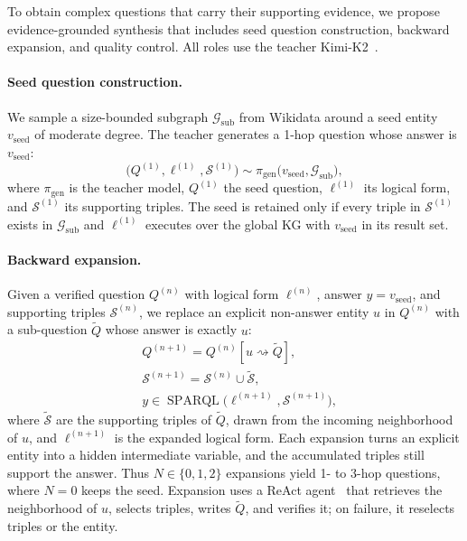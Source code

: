 To obtain complex questions that carry their supporting evidence, we propose evidence-grounded synthesis that includes seed question construction, backward expansion, and quality control. All roles use the teacher Kimi-K2~\citep{kimi}.

\paragraph{Seed question construction.}
We sample a size-bounded subgraph $\mathcal{G}_{\text{sub}}$ from Wikidata around a seed entity $v_{\text{seed}}$ of moderate degree. The teacher generates a 1-hop question whose answer is $v_{\text{seed}}$:
\begin{equation}
\label{eq:seed}
    \bigl(Q^{(1)}, \ell^{(1)}, \mathcal{S}^{(1)}\bigr)
    \sim \pi_{\text{gen}}\bigl(v_{\text{seed}}, \mathcal{G}_{\text{sub}}\bigr),
\end{equation}
where $\pi_{\text{gen}}$ is the teacher model, $Q^{(1)}$ the seed question, $\ell^{(1)}$ its logical form, and $\mathcal{S}^{(1)}$ its supporting triples. The seed is retained only if every triple in $\mathcal{S}^{(1)}$ exists in $\mathcal{G}_{\text{sub}}$ and $\ell^{(1)}$ executes over the global KG with $v_{\text{seed}}$ in its result set.

\paragraph{Backward expansion.}
Given a verified question $Q^{(n)}$ with logical form $\ell^{(n)}$, answer $y=v_{\text{seed}}$, and supporting triples $\mathcal{S}^{(n)}$, we replace an explicit non-answer entity $u$ in $Q^{(n)}$ with a sub-question $\tilde{Q}$ whose answer is exactly $u$:
\begin{equation}
\begin{aligned}
    &Q^{(n+1)} = Q^{(n)}[u \rightsquigarrow \tilde{Q}], \\
    &\mathcal{S}^{(n+1)} = \mathcal{S}^{(n)} \cup \tilde{\mathcal{S}}, \\
    &y \in \operatorname{SPARQL}\bigl(\ell^{(n+1)}, \mathcal{S}^{(n+1)}\bigr),
\end{aligned}
\end{equation}
where $\tilde{\mathcal{S}}$ are the supporting triples of $\tilde{Q}$, drawn from the incoming neighborhood of $u$, and $\ell^{(n+1)}$ is the expanded logical form. Each expansion turns an explicit entity into a hidden intermediate variable, and the accumulated triples still support the answer. Thus $N\in\{0,1,2\}$ expansions yield 1- to 3-hop questions, where $N=0$ keeps the seed. Expansion uses a ReAct agent~\citep{react} that retrieves the neighborhood of $u$, selects triples, writes $\tilde{Q}$, and verifies it; on failure, it reselects triples or the entity.

